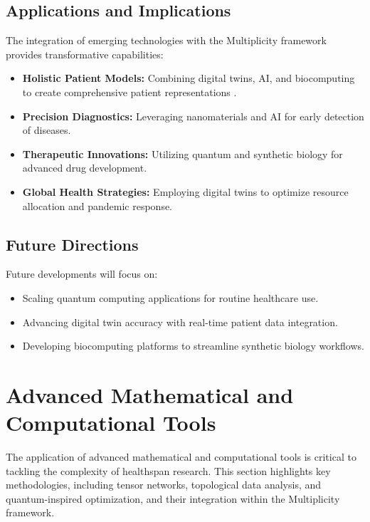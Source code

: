 \documentclass{article}
\theoremstyle{plain}
\begin{document}
\subsection{Applications and Implications}
The integration of emerging technologies with the Multiplicity framework provides transformative capabilities:
\begin{itemize}
    \item \textbf{Holistic Patient Models:} Combining digital twins, AI, and biocomputing to create comprehensive patient representations \cite{holisticModels2023}.
    \item \textbf{Precision Diagnostics:} Leveraging nanomaterials and AI for early detection of diseases.
    \item \textbf{Therapeutic Innovations:} Utilizing quantum and synthetic biology for advanced drug development.
    \item \textbf{Global Health Strategies:} Employing digital twins to optimize resource allocation and pandemic response.
\end{itemize}

\subsection{Future Directions}
Future developments will focus on:
\begin{itemize}
    \item Scaling quantum computing applications for routine healthcare use.
    \item Advancing digital twin accuracy with real-time patient data integration.
    \item Developing biocomputing platforms to streamline synthetic biology workflows.
\end{itemize}

\section{Advanced Mathematical and Computational Tools}
\label{sec:math_computational_tools}

The application of advanced mathematical and computational tools is critical to tackling the complexity of healthspan research. This section highlights key methodologies, including tensor networks, topological data analysis, and quantum-inspired optimization, and their integration within the Multiplicity framework.
\end{document}
